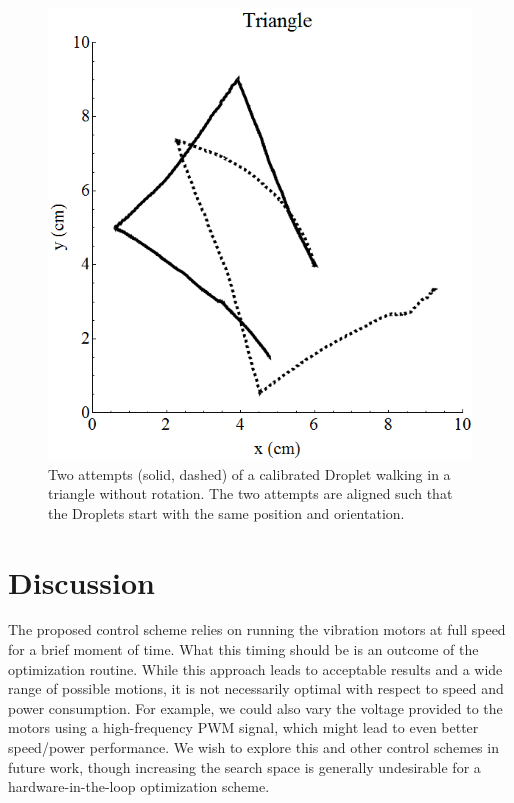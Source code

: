 \documentclass[letterpaper, 10pt, conference]{ieeeconf}
\begin{document}
\begin{figure}[!htb]
\centering
\includegraphics[width=0.9\linewidth]{Images/DropletWalksTriangle}
\caption{Two attempts (solid, dashed) of a calibrated Droplet walking in a triangle without rotation. The two attempts are aligned such that the Droplets start with the same position and orientation.}
\label{fig:triangleWalk}
\end{figure}

\section{Discussion}
The proposed control scheme relies on running the vibration motors at full speed for a brief moment of time. What this timing should be is an outcome of the optimization routine. While this approach leads to acceptable results and a wide range of possible motions, it is not necessarily optimal with respect to speed and power consumption. For example, we could also vary the voltage provided to the motors using a high-frequency PWM signal, which might lead to even better speed/power performance. We wish to explore this and other control schemes in future work, though increasing the search space is generally undesirable for a hardware-in-the-loop optimization scheme.  
\end{document}
